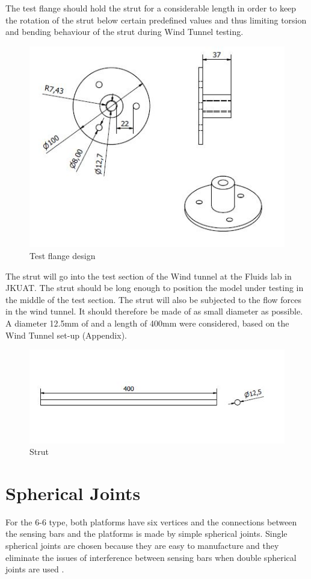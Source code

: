 The test flange should hold the strut for a considerable length in order to keep the rotation of the strut below certain predefined values and thus limiting torsion and bending behaviour of the strut during Wind Tunnel testing.
\begin{center}
	\begin{figure}[!h]
	\centering
	\includegraphics[width=0.75\linewidth]{Figures/Test}
	\caption[Test flange]{Test flange design}
	\end{figure}
\end{center}
The strut will go into the test section of the Wind tunnel at the Fluids lab in JKUAT. The strut should be long enough to position the model under testing in the middle of the test section. The strut will also be subjected to the flow forces in the wind tunnel. It should therefore be made of as small diameter as possible. A diameter 12.5mm of and a length of 400mm were considered, based on the Wind Tunnel set-up (Appendix).
\begin{center}
	\begin{figure}[!h]
	\centering
	\includegraphics[width=0.75\linewidth]{Figures/Strut}
	\caption[Strut]{Strut}
	\end{figure}
\end{center}

\section{Spherical Joints}
For the 6-6 type, both platforms have six vertices and
the connections between the sensing bars and the platforms is made by simple spherical joints. Single spherical joints are chosen because they are easy to manufacture and they eliminate the issues of interference between sensing bars when double spherical joints are used \cite{fernandes_design_nodate}. 

